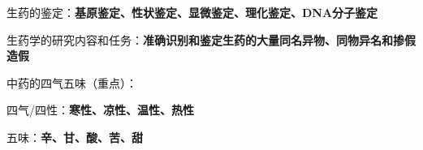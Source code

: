 \begin{notation}
    生药的鉴定：\textbf{基原鉴定、性状鉴定、显微鉴定、理化鉴定、DNA分子鉴定}
\end{notation}
\begin{notation}
    生药学的研究内容和任务：\textbf{准确识别和鉴定生药的大量同名异物、同物异名和掺假造假}
\end{notation}
\begin{notation}
    中药的四气五味（重点）：

    四气/四性：\textbf{寒性、凉性、温性、热性}

    五味：\textbf{辛、甘、酸、苦、甜}
\end{notation}
